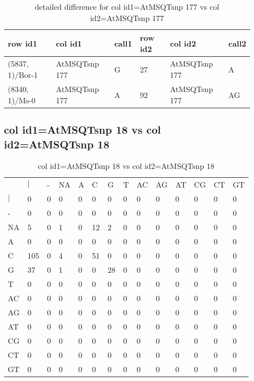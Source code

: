 \begin{center}
\begin{longtable}{|l|l|l|l|l|l|}
\caption{detailed difference for col id1=AtMSQTsnp 177 vs col id2=AtMSQTsnp 177} \label{table_dm557}\\
\hline
row id1&col id1&call1&row id2&col id2&call2\\
\hline
(5837, 1)/Bor-1&AtMSQTsnp 177&G&27&AtMSQTsnp 177&A\\
(8340, 1)/Ms-0&AtMSQTsnp 177&A&92&AtMSQTsnp 177&AG\\
\hline
\end{longtable}
\end{center}

\subsection{col id1=AtMSQTsnp 18 vs col id2=AtMSQTsnp 18}
\begin{center}
\begin{longtable}{|l|l|l|l|l|l|l|l|l|l|l|l|l|l|}
\caption{col id1=AtMSQTsnp 18 vs col id2=AtMSQTsnp 18} \label{table_dm558}\\
\hline
\\
\hline
&$|$&-&NA&A&C&G&T&AC&AG&AT&CG&CT&GT\\
$|$&0&0&0&0&0&0&0&0&0&0&0&0&0\\
-&0&0&0&0&0&0&0&0&0&0&0&0&0\\
NA&5&0&1&0&12&2&0&0&0&0&0&0&0\\
A&0&0&0&0&0&0&0&0&0&0&0&0&0\\
C&105&0&4&0&51&0&0&0&0&0&0&0&0\\
G&37&0&1&0&0&28&0&0&0&0&0&0&0\\
T&0&0&0&0&0&0&0&0&0&0&0&0&0\\
AC&0&0&0&0&0&0&0&0&0&0&0&0&0\\
AG&0&0&0&0&0&0&0&0&0&0&0&0&0\\
AT&0&0&0&0&0&0&0&0&0&0&0&0&0\\
CG&0&0&0&0&0&0&0&0&0&0&0&0&0\\
CT&0&0&0&0&0&0&0&0&0&0&0&0&0\\
GT&0&0&0&0&0&0&0&0&0&0&0&0&0\\
\hline
\end{longtable}
\end{center}

